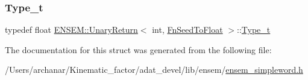 \mbox{\label{structENSEM_1_1UnaryReturn_3_01int_00_01FnSeedToFloat_01_4_ae22c1dee5b905b38ddda98907a2eb2fd}} 
\subsubsection{\texorpdfstring{Type\_t}{Type\_t}\hspace{0.1cm}{\footnotesize\ttfamily [2/2]}}
{\footnotesize\ttfamily typedef float \mbox{\hyperlink{structENSEM_1_1UnaryReturn}{E\+N\+S\+E\+M\+::\+Unary\+Return}}$<$ int, \mbox{\hyperlink{structENSEM_1_1FnSeedToFloat}{Fn\+Seed\+To\+Float}} $>$\+::\mbox{\hyperlink{structENSEM_1_1UnaryReturn_3_01int_00_01FnSeedToFloat_01_4_ae22c1dee5b905b38ddda98907a2eb2fd}{Type\+\_\+t}}}



The documentation for this struct was generated from the following file\+:\begin{DoxyCompactItemize}
\item 
/\+Users/archanar/\+Kinematic\+\_\+factor/adat\+\_\+devel/lib/ensem/\mbox{\hyperlink{lib_2ensem_2ensem__simpleword_8h}{ensem\+\_\+simpleword.\+h}}\end{DoxyCompactItemize}
